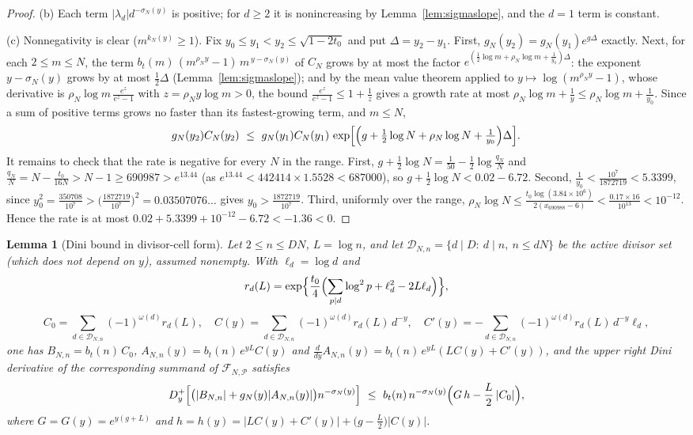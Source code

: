 \documentclass[11pt]{article}
\newtheorem{lemma}[theorem]{Lemma}
\theoremstyle{definition}
\newcommand{\calP}{\mathcal{P}}
\begin{document}
\begin{proof}
(b) Each term $|\lambda_d|d^{-\sigma_N(y)}$ is positive; for
$d\ge2$ it is nonincreasing by Lemma~\ref{lem:sigmaslope}, and the
$d=1$ term is constant.

(c) Nonnegativity is clear ($m^{k_N(y)}\ge1$). Fix
$y_0\le y_1<y_2\le\sqrt{1-2t_0}$ and put $\Delta=y_2-y_1$. First,
$g_N(y_2)=g_N(y_1)e^{g\Delta}$ exactly. Next, for each
$2\le m\le N$, the term
$b_t(m)\,(m^{\rho_Ny}-1)\,m^{\,y-\sigma_N(y)}$ of $C_N$ grows by at
most the factor $e^{(\frac12\log m+\rho_N\log m+\frac1{y_0})\Delta}$:
the exponent $y-\sigma_N(y)$ grows by at most $\frac12\Delta$
(Lemma~\ref{lem:sigmaslope}); and by the mean value theorem applied
to $y\mapsto\log(m^{\rho_Ny}-1)$, whose derivative is
$\rho_N\log m\,\frac{e^z}{e^z-1}$ with $z=\rho_Ny\log m>0$, the
bound $\frac{e^z}{e^z-1}\le1+\frac1z$ gives a growth rate at most
$\rho_N\log m+\frac1{y}\le\rho_N\log m+\frac1{y_0}$. Since a sum of
positive terms grows no faster than its fastest-growing term, and
$m\le N$,
\[
g_N(y_2)C_N(y_2)\ \le\
g_N(y_1)C_N(y_1)\,
\exp\Bigl[\Bigl(g+\tfrac12\log N+\rho_N\log N
+\tfrac1{y_0}\Bigr)\Delta\Bigr].
\]
It remains to check that the rate is negative for every $N$ in the
range. First, $g+\frac12\log N=\frac1{50}-\frac12\log\frac{q_N}N$
and $\frac{q_N}N=N-\frac{t_0}{16N}>N-1\ge690987>e^{13.44}$ (as
$e^{13.44}<442414\times1.5528<687000$), so
$g+\frac12\log N<0.02-6.72$. Second,
$\frac1{y_0}<\frac{10^7}{1872719}<5.3399$, since
$y_0^2=\frac{350708}{10^7}>\bigl(\frac{1872719}{10^7}\bigr)^2
=0.03507076\ldots$ gives $y_0>\frac{1872719}{10^7}$. Third,
uniformly over the range,
$\rho_N\log N\le\frac{t_0\log(3.84\times10^6)}{2(x_{690988}-6)}
<\frac{0.17\times16}{10^{13}}<10^{-12}$. Hence the rate is at most
$0.02+5.3399+10^{-12}-6.72<-1.36<0$.
\end{proof}

\begin{lemma}[Dini bound in divisor-cell form]\label{lem:dini}
Let $2\le n\le DN$, $L=\log n$, and let
$\mathcal D_{N,n}=\{d\mid D:\ d\mid n,\ n\le dN\}$ be the active
divisor set (which does not depend on $y$), assumed nonempty. With
$\ell_d=\log d$ and
\[
r_d(L)=\exp\Bigl\{\frac{t_0}4\Bigl(\sum_{p\mid d}\log^2p
+\ell_d^2-2L\ell_d\Bigr)\Bigr\},
\]
\[
C_0=\sum_{d\in\mathcal D_{N,n}}(-1)^{\omega(d)}r_d(L),
\quad
C(y)=\sum_{d\in\mathcal D_{N,n}}(-1)^{\omega(d)}r_d(L)\,d^{-y},
\quad
C'(y)=-\sum_{d\in\mathcal D_{N,n}}(-1)^{\omega(d)}r_d(L)\,
d^{-y}\ell_d,
\]
one has $B_{N,n}=b_t(n)\,C_0$,
$A_{N,n}(y)=b_t(n)\,e^{yL}C(y)$ and
$\frac{d}{dy}A_{N,n}(y)=b_t(n)\,e^{yL}(LC(y)+C'(y))$, and the upper
right Dini derivative of the corresponding summand of
$\mathcal F_{N,\calP}$ satisfies
\[
D^+_y\Bigl[\bigl(|B_{N,n}|+g_N(y)|A_{N,n}(y)|\bigr)
n^{-\sigma_N(y)}\Bigr]
\ \le\
b_t(n)\,n^{-\sigma_N(y)}
\Bigl(G\,h-\frac L2\,|C_0|\Bigr),
\]
where $G=G(y)=e^{y(g+L)}$ and
$h=h(y)=|LC(y)+C'(y)|+\bigl(g-\tfrac L2\bigr)|C(y)|$.
\end{lemma}
\end{document}
